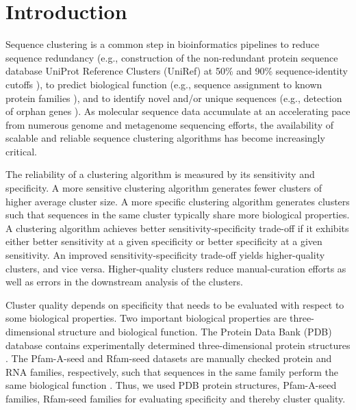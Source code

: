 \documentclass{bioinfo}
\begin{document}
\section{Introduction}

Sequence clustering is a common step in bioinformatics pipelines to reduce sequence redundancy (e.g., construction of the non-redundant protein sequence database UniProt Reference Clusters (UniRef) at 50\% and 90\% sequence-identity cutoffs \citep{suzek2007uniref}), to predict biological function (e.g., sequence assignment to known protein families \citep{finn2016pfam}), and to identify novel and/or unique sequences (e.g., detection of orphan genes \citep{prabh2016orphan}). As molecular sequence data accumulate at an accelerating pace from numerous genome and metagenome sequencing efforts, the availability of scalable and reliable sequence clustering algorithms has become increasingly critical.

The reliability of a clustering algorithm is measured by its sensitivity and specificity.
A more sensitive clustering algorithm generates fewer clusters of higher average cluster size.
A more specific clustering algorithm generates clusters such that sequences in the same cluster typically share more biological properties.
A clustering algorithm achieves better sensitivity-specificity trade-off if it exhibits either better sensitivity at a given specificity or better specificity at a given sensitivity.
An improved sensitivity-specificity trade-off yields higher-quality clusters, and vice versa.
Higher-quality clusters reduce manual-curation efforts as well as errors in the downstream analysis of the clusters.

Cluster quality depends on specificity that needs to be evaluated with respect to some biological properties.
Two %
important biological properties are three-dimensional structure and biological function.
The Protein Data Bank (PDB) database contains experimentally determined three-dimensional protein structures \citep{berman2006protein}.
The Pfam-A-seed and Rfam-seed datasets are manually checked protein and RNA families, respectively, such that sequences in the same family perform the same biological function \citep{finn2016pfam,nawrocki2014rfam}.
Thus, we used PDB protein structures, Pfam-A-seed families,  Rfam-seed families for evaluating specificity and thereby cluster quality.
\end{document}
